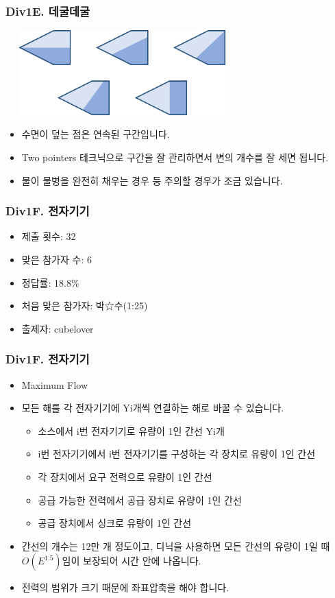\documentclass[xetex]{beamer}
\begin{document}
\begin{frame}
  \frametitle{Div1E. 데굴데굴}
  \begin{center}
    \includegraphics[width=0.6\textwidth]{roll-sol.png}
  \end{center}
  \begin{itemize}
    \item 수면이 덮는 점은 연속된 구간입니다.
    \item Two pointers 테크닉으로 구간을 잘 관리하면서 변의 개수를 잘 세면 됩니다.
    \item 물이 물병을 완전히 채우는 경우 등 주의할 경우가 조금 있습니다.
  \end{itemize}
\end{frame}

\begin{frame}
  \frametitle{Div1F. 전자기기}
  \begin{itemize}
    \item 제출 횟수: 32
    \item 맞은 참가자 수: 6
    \item 정답률: 18.8\%
    \item 처음 맞은 참가자: 박☆수(1:25)
    \item 출제자: cubelover
  \end{itemize}
\end{frame}

\begin{frame}
  \frametitle{Div1F. 전자기기}
  \begin{itemize}
    \item Maximum Flow
    \item 모든 해를 각 전자기기에 Yi개씩 연결하는 해로 바꿀 수 있습니다.
    \begin{itemize}
      \item 소스에서 i번 전자기기로 유량이 1인 간선 Yi개
      \item i번 전자기기에서 i번 전자기기를 구성하는 각 장치로 유량이 1인 간선
      \item 각 장치에서 요구 전력으로 유량이 1인 간선
      \item 공급 가능한 전력에서 공급 장치로 유량이 1인 간선
      \item 공급 장치에서 싱크로 유량이 1인 간선
    \end{itemize}
    \item 간선의 개수는 12만 개 정도이고, 디닉을 사용하면 모든 간선의 유량이 1일 때 $O(E^{1.5})$임이 보장되어 시간 안에 나옵니다.
    \item 전력의 범위가 크기 때문에 좌표압축을 해야 합니다.
  \end{itemize}
\end{frame}
\end{document}
